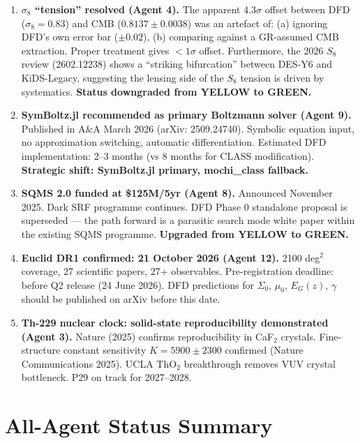 \documentclass[11pt,a4paper]{article}
\begin{document}
\begin{enumerate}

\item \textbf{$\sigma_8$ ``tension'' resolved (Agent 4).} The apparent $4.3\sigma$ offset between DFD ($\sigma_8 = 0.83$) and CMB ($0.8137 \pm 0.0038$) was an artefact of: (a) ignoring DFD's own error bar ($\pm 0.02$), (b) comparing against a GR-assumed CMB extraction. Proper treatment gives $<1\sigma$ offset. Furthermore, the 2026 $S_8$ review (2602.12238) shows a ``striking bifurcation'' between DES-Y6 and KiDS-Legacy, suggesting the lensing side of the $S_8$ tension is driven by systematics. \textbf{Status downgraded from YELLOW to GREEN.}

\item \textbf{SymBoltz.jl recommended as primary Boltzmann solver (Agent 9).} Published in A\&A March 2026 (arXiv: 2509.24740). Symbolic equation input, no approximation switching, automatic differentiation. Estimated DFD implementation: 2--3 months (vs 8 months for CLASS modification). \textbf{Strategic shift: SymBoltz.jl primary, mochi\_class fallback.}

\item \textbf{SQMS 2.0 funded at \$125M/5yr (Agent 8).} Announced November 2025. Dark SRF programme continues. DFD Phase 0 standalone proposal is superseded --- the path forward is a parasitic search mode white paper within the existing SQMS programme. \textbf{Upgraded from YELLOW to GREEN.}

\item \textbf{Euclid DR1 confirmed: 21 October 2026 (Agent 12).} 2100 deg$^2$ coverage, 27 scientific papers, 27+ observables. Pre-registration deadline: before Q2 release (24 June 2026). DFD predictions for $\Sigma_0$, $\mu_0$, $E_G(z)$, $\gamma$ should be published on arXiv before this date.

\item \textbf{Th-229 nuclear clock: solid-state reproducibility demonstrated (Agent 3).} Nature (2025) confirms reproducibility in CaF$_2$ crystals. Fine-structure constant sensitivity $K = 5900 \pm 2300$ confirmed (Nature Communications 2025). UCLA ThO$_2$ breakthrough removes VUV crystal bottleneck. P29 on track for 2027--2028.

\end{enumerate}

\section{All-Agent Status Summary}
\end{document}
